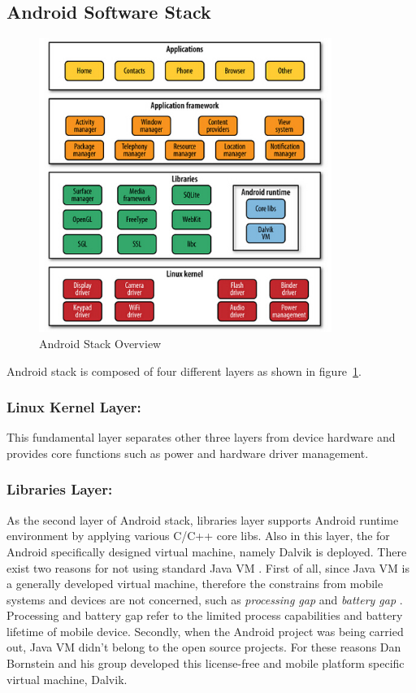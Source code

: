 \subsection{Android Software Stack}
\begin{figure}[!htb]
	\centering
	\includegraphics[width=0.85\textwidth]{android-stack.jpg}
		\caption{Android Stack Overview \cite{learn_android}}
	\label{fig:android-stack}
\end{figure}
Android stack is composed of four different layers as shown in figure~\ref{fig:android-stack}.

\subsubsection{Linux Kernel Layer:}This fundamental layer separates other three layers  from  device hardware and provides core functions such as  power and hardware driver management.
\subsubsection{Libraries Layer:}As the second layer of Android stack,  libraries layer supports Android runtime environment by applying various C/C++ core libs.  Also in this layer, the for Android specifically designed virtual machine, namely Dalvik \cite{learn_android} is deployed. There exist two reasons for not using standard Java VM \cite{learn_android}. First of all, since Java VM is a generally developed virtual machine, therefore the constrains from mobile systems and devices are not concerned, such as \emph{processing gap} and \emph{battery gap} \cite{embedded_secure}. Processing and battery gap refer to the limited process capabilities and battery lifetime of mobile device. Secondly, when the Android project was being carried out, Java VM didn't belong to the open source projects. For these reasons Dan Bornstein and his group developed this license-free and mobile platform specific virtual machine, Dalvik. 

